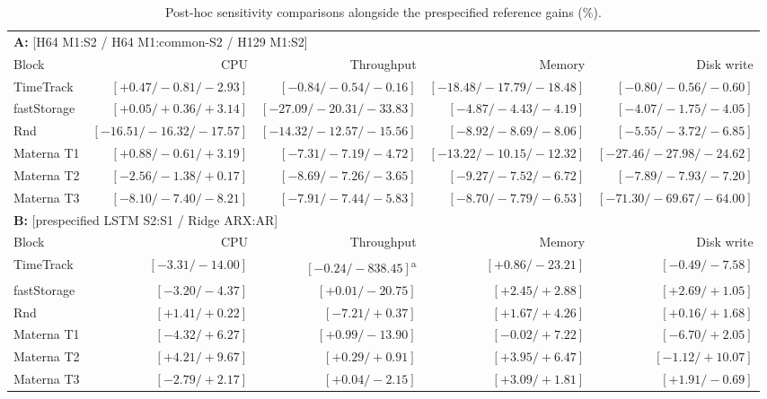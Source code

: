 \documentclass[5p,twocolumn]{elsarticle}
\begin{document}
\begin{table}[t]
  \caption{Post-hoc sensitivity comparisons alongside the prespecified reference gains (\%).}
  \label{tab:posthoc-controls}
  \centering
  \small
  \setlength{\tabcolsep}{2pt}
  \renewcommand{\arraystretch}{1.12}
  \begin{tabular*}{\textwidth}{@{\extracolsep{\fill}}lrrrr@{}}
    \toprule
    \multicolumn{5}{l}{\textbf{A:} [H64 M1:S2 / H64 M1:common-S2 / H129 M1:S2]} \\
    Block & CPU & Throughput & Memory & Disk write \\
    \midrule
    TimeTrack & $[+0.47/-0.81/-2.93]$ & $[-0.84/-0.54/-0.16]$ & $[-18.48/-17.79/-18.48]$ & $[-0.80/-0.56/-0.60]$ \\
    fastStorage & $[+0.05/+0.36/+3.14]$ & $[-27.09/-20.31/-33.83]$ & $[-4.87/-4.43/-4.19]$ & $[-4.07/-1.75/-4.05]$ \\
    Rnd & $[-16.51/-16.32/-17.57]$ & $[-14.32/-12.57/-15.56]$ & $[-8.92/-8.69/-8.06]$ & $[-5.55/-3.72/-6.85]$ \\
    Materna T1 & $[+0.88/-0.61/+3.19]$ & $[-7.31/-7.19/-4.72]$ & $[-13.22/-10.15/-12.32]$ & $[-27.46/-27.98/-24.62]$ \\
    Materna T2 & $[-2.56/-1.38/+0.17]$ & $[-8.69/-7.26/-3.65]$ & $[-9.27/-7.52/-6.72]$ & $[-7.89/-7.93/-7.20]$ \\
    Materna T3 & $[-8.10/-7.40/-8.21]$ & $[-7.91/-7.44/-5.83]$ & $[-8.70/-7.79/-6.53]$ & $[-71.30/-69.67/-64.00]$ \\
    \midrule
    \multicolumn{5}{l}{\textbf{B:} [prespecified LSTM S2:S1 / Ridge ARX:AR]} \\
    Block & CPU & Throughput & Memory & Disk write \\
    \midrule
    TimeTrack & $[-3.31/-14.00]$ & $[-0.24/-838.45]$\textsuperscript{a} & $[+0.86/-23.21]$ & $[-0.49/-7.58]$ \\
    fastStorage & $[-3.20/-4.37]$ & $[+0.01/-20.75]$ & $[+2.45/+2.88]$ & $[+2.69/+1.05]$ \\
    Rnd & $[+1.41/+0.22]$ & $[-7.21/+0.37]$ & $[+1.67/+4.26]$ & $[+0.16/+1.68]$ \\
    Materna T1 & $[-4.32/+6.27]$ & $[+0.99/-13.90]$ & $[-0.02/+7.22]$ & $[-6.70/+2.05]$ \\
    Materna T2 & $[+4.21/+9.67]$ & $[+0.29/+0.91]$ & $[+3.95/+6.47]$ & $[-1.12/+10.07]$ \\
    Materna T3 & $[-2.79/+2.17]$ & $[+0.04/-2.15]$ & $[+3.09/+1.81]$ & $[+1.91/-0.69]$ \\
    \bottomrule

\end{tabular*}
\end{table}
\end{document}
